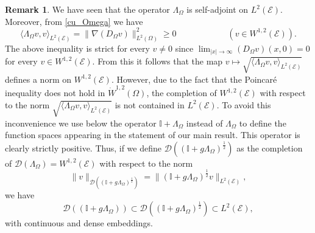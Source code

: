 \documentclass{amsart} %
\numberwithin{equation}{section}
\theoremstyle{definition}
\newtheorem{remark}[theorem]{Remark}
\renewcommand{\geq} {\geqslant}
\begin{document}
\begin{remark}\label{Lambda_Omega_positive}
We have seen that the operator $\Lambda_{\Omega}$ is self-adjoint on $L^2(\mathcal{E})$. Moreover, 
from \eqref{cu_Omega} we have 
\begin{equation}
    \langle\Lambda_\Omega v, v\rangle_{L^2(\mathcal{E})}=\|\nabla(D_\Omega v)\|_{L^2(\Omega)}^2\geq 0 \qquad\qquad\qquad(v\in W^{1,2}(\mathcal{E})).
\end{equation}
The above inequality is strict for every $v\neq 0$ since $\displaystyle\lim_{|x|\to \infty} (D_\Omega v)(x,0)=0$ for every $v\in W^{1,2}(\mathcal{E})$.
From this it follows that the map $v\mapsto \sqrt{\langle\Lambda_\Omega v, v\rangle_{L^2(\mathcal{E})}}$ defines a norm on $W^{1,2}(\mathcal{E})$.
However, due to the fact that the Poincar\'e inequality does not hold in $\dot W^{1,2}(\Omega)$, the  completion  of $W^{1,2}(\mathcal{E})$
with respect to the norm $\sqrt{\langle\Lambda_\Omega v, v\rangle_{L^2(\mathcal{E})}}$ is not contained in $L^2(\mathcal{E})$. 
To avoid this inconvenience we use below the operator $\mathbb{I}+\Lambda_\Omega$ instead of $\Lambda_\Omega$ to define the function spaces appearing in the statement of our main result.  This operator is clearly strictly positive. Thus, if we define $\mathcal{D}((\mathbb{I}+g\Lambda_{\Omega})^{\frac12})$ as the completion of $\mathcal{D}(\Lambda_{\Omega})=W^{1,2}(\mathcal{E})$ with respect to the norm
\begin{equation}
    \|v\|_{\mathcal{D}((\mathbb{I}+g\Lambda_{\Omega})^{\frac12})}=\|(\mathbb{I}+g\Lambda_{\Omega})^{\frac12}v\|_{L^2(\mathcal{E})},
\end{equation} 
we have 
$$
\mathcal{D}((\mathbb{I}+g\Lambda_{\Omega}))\subset {\mathcal{D}((\mathbb{I}+g\Lambda_{\Omega})^{\frac12})}\subset L^2(\mathcal{E}),
$$
with continuous and dense embeddings.
\end{remark}
\end{document}
